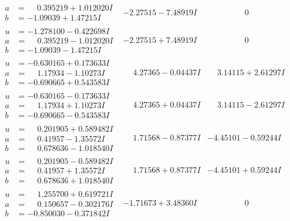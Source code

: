 \documentclass[1p]{elsarticle_modified}
\theoremstyle{definition}
\begin{document}
$$\begin{array}{c|c|c}
\begin{aligned}
a &= \phantom{-}0.395219 + 1.012020 I \\
b &= -1.09039 + 1.47215 I\end{aligned}
 & -2.27515 - 7.48919 I & \phantom{-0.000000 } 0 \\ \hline\begin{aligned}
u &= -1.278100 - 0.422698 I \\
a &= \phantom{-}0.395219 - 1.012020 I \\
b &= -1.09039 - 1.47215 I\end{aligned}
 & -2.27515 + 7.48919 I & \phantom{-0.000000 } 0 \\ \hline\begin{aligned}
u &= -0.630165 + 0.173633 I \\
a &= \phantom{-}1.17934 - 1.10273 I \\
b &= -0.690665 + 0.543583 I\end{aligned}
 & \phantom{-}4.27365 - 0.04437 I & \phantom{-}3.14115 + 2.61297 I \\ \hline\begin{aligned}
u &= -0.630165 - 0.173633 I \\
a &= \phantom{-}1.17934 + 1.10273 I \\
b &= -0.690665 - 0.543583 I\end{aligned}
 & \phantom{-}4.27365 + 0.04437 I & \phantom{-}3.14115 - 2.61297 I \\ \hline\begin{aligned}
u &= \phantom{-}0.201905 + 0.589482 I \\
a &= \phantom{-}0.41957 - 1.35572 I \\
b &= \phantom{-}0.678636 - 1.018540 I\end{aligned}
 & \phantom{-}1.71568 - 0.87377 I & -4.45101 - 0.59244 I \\ \hline\begin{aligned}
u &= \phantom{-}0.201905 - 0.589482 I \\
a &= \phantom{-}0.41957 + 1.35572 I \\
b &= \phantom{-}0.678636 + 1.018540 I\end{aligned}
 & \phantom{-}1.71568 + 0.87377 I & -4.45101 + 0.59244 I \\ \hline\begin{aligned}
u &= \phantom{-}1.255700 + 0.619721 I \\
a &= \phantom{-}0.150657 - 0.302176 I \\
b &= -0.850030 - 0.371842 I\end{aligned}
 & -1.71673 + 3.48360 I & \phantom{-0.000000 } 0 \\ \hline\begin{aligned}

\end{aligned}
\end{array}$$
\end{document}
